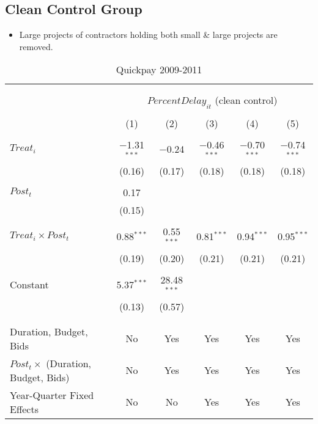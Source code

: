 \documentclass[
]{article}
\providecommand{\tightlist}{%
  \setlength{\itemsep}{0pt}\setlength{\parskip}{0pt}}
\begin{document}
\hypertarget{clean-control-group}{%
\subsection{Clean Control Group}\label{clean-control-group}}

\begin{itemize}
\tightlist
\item
  Large projects of contractors holding both small \& large projects are
  removed.
\end{itemize}

\begin{table}[H] \centering 
  \caption{Quickpay 2009-2011} 
  \label{} 
\small 
\begin{tabular}{@{\extracolsep{-2pt}}lccccc} 
\\[-1.8ex]\hline 
\hline \\[-1.8ex] 
\\[-1.8ex] & \multicolumn{5}{c}{$PercentDelay_{it}$ (clean control)} \\ 
\\[-1.8ex] & (1) & (2) & (3) & (4) & (5)\\ 
\hline \\[-1.8ex] 
 $Treat_i$ & $-$1.31$^{***}$ & $-$0.24 & $-$0.46$^{***}$ & $-$0.70$^{***}$ & $-$0.74$^{***}$ \\ 
  & (0.16) & (0.17) & (0.18) & (0.18) & (0.18) \\ 
  & & & & & \\ 
 $Post_t$ & 0.17 &  &  &  &  \\ 
  & (0.15) &  &  &  &  \\ 
  & & & & & \\ 
 $Treat_i \times Post_t$ & 0.88$^{***}$ & 0.55$^{***}$ & 0.81$^{***}$ & 0.94$^{***}$ & 0.95$^{***}$ \\ 
  & (0.19) & (0.20) & (0.21) & (0.21) & (0.21) \\ 
  & & & & & \\ 
 Constant & 5.37$^{***}$ & 28.48$^{***}$ &  &  &  \\ 
  & (0.13) & (0.57) &  &  &  \\ 
  & & & & & \\ 
\hline \\[-1.8ex] 
Duration, Budget, Bids & No & Yes & Yes & Yes & Yes \\ 
$Post_t \times$  (Duration, Budget, Bids) & No & Yes & Yes & Yes & Yes \\ 
Year-Quarter Fixed Effects & No & No & Yes & Yes & Yes \\ 

\end{tabular}
\end{table}
\end{document}
